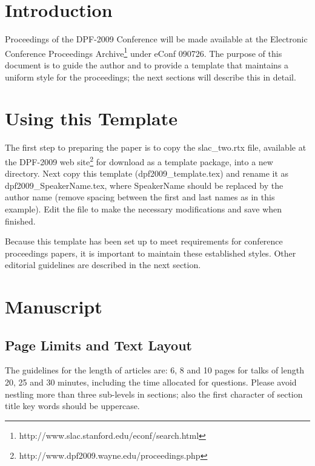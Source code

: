 \thispagestyle{fancy}


\section{Introduction}
Proceedings of the DPF-2009 Conference
will be made available at the Electronic Conference Proceedings 
Archive\footnote{http://www.slac.stanford.edu/econf/search.html}
under eConf 090726.  
The purpose of this document is to guide the author and to provide a template 
that maintains a uniform style for the proceedings; the next sections
will describe this in detail.

\section{Using this Template}
The first step to preparing the paper is to copy the slac\_two.rtx file, 
available at the 
DPF-2009 web site\footnote{http://www.dpf2009.wayne.edu/proceedings.php} 
for download as a template package, into a new directory.
Next copy this template (dpf2009\_template.tex) 
and rename it as dpf2009\_SpeakerName.tex, 
where SpeakerName should be replaced by the author name
(remove spacing between the first and last names as in this example). 
Edit the file to make the necessary modifications and save when finished. 

Because this template has been set up to meet requirements for conference proceedings  
papers, it is important to maintain these established styles.   
Other editorial guidelines are described in the next section.

\section{Manuscript}


\subsection{Page Limits and Text Layout}
The guidelines for the length of articles are: 6, 8 and 10 pages for talks of length 20, 25 and 
30 minutes, including the time allocated for questions.  Please avoid nestling more than 
three sub-levels in sections; also the first character of section title key words should be
uppercase.

